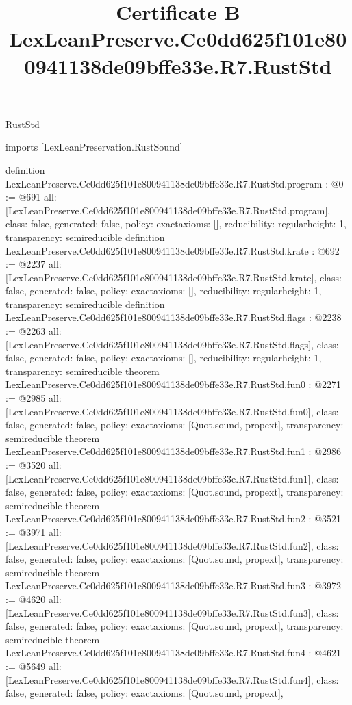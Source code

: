 \begin{lexlean}{RustStd}
\title{Certificate B LexLeanPreserve.Ce0dd625f101e800941138de09bffe33e.R7.RustStd}
\begin{coremodule}
imports [LexLeanPreservation.RustSound]

definition LexLeanPreserve.Ce0dd625f101e800941138de09bffe33e.R7.RustStd.program : @0 := @691 {
  all: [LexLeanPreserve.Ce0dd625f101e800941138de09bffe33e.R7.RustStd.program],
  class: false,
  generated: false,
  policy: exact{axioms: []},
  reducibility: regular{height: 1},
  transparency: semireducible
}
definition LexLeanPreserve.Ce0dd625f101e800941138de09bffe33e.R7.RustStd.krate : @692 := @2237 {
  all: [LexLeanPreserve.Ce0dd625f101e800941138de09bffe33e.R7.RustStd.krate],
  class: false,
  generated: false,
  policy: exact{axioms: []},
  reducibility: regular{height: 1},
  transparency: semireducible
}
definition LexLeanPreserve.Ce0dd625f101e800941138de09bffe33e.R7.RustStd.flags : @2238 := @2263 {
  all: [LexLeanPreserve.Ce0dd625f101e800941138de09bffe33e.R7.RustStd.flags],
  class: false,
  generated: false,
  policy: exact{axioms: []},
  reducibility: regular{height: 1},
  transparency: semireducible
}
theorem LexLeanPreserve.Ce0dd625f101e800941138de09bffe33e.R7.RustStd.fun0 : @2271 := @2985 {
  all: [LexLeanPreserve.Ce0dd625f101e800941138de09bffe33e.R7.RustStd.fun0],
  class: false,
  generated: false,
  policy: exact{axioms: [Quot.sound, propext]},
  transparency: semireducible
}
theorem LexLeanPreserve.Ce0dd625f101e800941138de09bffe33e.R7.RustStd.fun1 : @2986 := @3520 {
  all: [LexLeanPreserve.Ce0dd625f101e800941138de09bffe33e.R7.RustStd.fun1],
  class: false,
  generated: false,
  policy: exact{axioms: [Quot.sound, propext]},
  transparency: semireducible
}
theorem LexLeanPreserve.Ce0dd625f101e800941138de09bffe33e.R7.RustStd.fun2 : @3521 := @3971 {
  all: [LexLeanPreserve.Ce0dd625f101e800941138de09bffe33e.R7.RustStd.fun2],
  class: false,
  generated: false,
  policy: exact{axioms: [Quot.sound, propext]},
  transparency: semireducible
}
theorem LexLeanPreserve.Ce0dd625f101e800941138de09bffe33e.R7.RustStd.fun3 : @3972 := @4620 {
  all: [LexLeanPreserve.Ce0dd625f101e800941138de09bffe33e.R7.RustStd.fun3],
  class: false,
  generated: false,
  policy: exact{axioms: [Quot.sound, propext]},
  transparency: semireducible
}
theorem LexLeanPreserve.Ce0dd625f101e800941138de09bffe33e.R7.RustStd.fun4 : @4621 := @5649 {
  all: [LexLeanPreserve.Ce0dd625f101e800941138de09bffe33e.R7.RustStd.fun4],
  class: false,
  generated: false,
  policy: exact{axioms: [Quot.sound, propext]},
}
\end{coremodule}
\end{lexlean}
